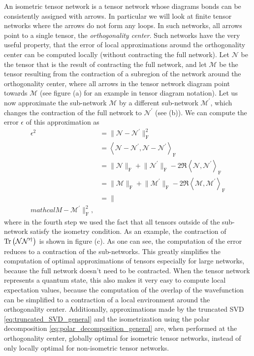 An isometric tensor network is a tensor network whose diagrams bonds can be consistently assigned with arrows. In particular we will look at finite tensor networks where the arrows do not form any loops. In such networks, all arrows point to a single tensor, the \textit{orthogonality center}. Such networks have the very useful property, that the error of local approximations around the orthogonality center can be computed locally (without contracting the full network). Let $\mathcal{N}$ be the tensor that is the result of contracting the full network, and let $\mathcal{M}$ be the tensor resulting from the contraction of a subregion of the network around the orthogonality center, where all arrows in the tensor network diagram point towards $\mathcal{M}$ (see figure (a) for an example in tensor diagram notation). Let us now approximate the sub-network $\mathcal{M}$ by a different sub-network $\mathcal{M}^\prime$, which changes the contraction of the full network to $\mathcal{N}^\prime$ (see (b)). We can compute the error $\epsilon$ of this approximation as
\begin{equation}
\begin{split}
	\epsilon^2 &= \lVert\mathcal{N}-\mathcal{N}^\prime\rVert^2_\text{F} \\
	&=
	\left\langle\mathcal{N}-\mathcal{N}^\prime, \mathcal{N}-\mathcal{N}^\prime\right\rangle_\text{F} \\
	&= \lVert\mathcal{N}\rVert_\text{F} + \lVert\mathcal{N}^\prime\rVert_\text{F} - 2\Re\left\langle\mathcal{N},\mathcal{N}^\prime\right\rangle_\text{F} \\
	&= \lVert\mathcal{M}\rVert_\text{F} + \lVert\mathcal{M}^\prime\rVert_\text{F} - 2\Re\left\langle\mathcal{M},\mathcal{M}^\prime\right\rangle_\text{F} \\
	&= \lVert\\mathcal{M}-\mathcal{M}^\prime\rVert^2_\text{F},
\end{split}
\end{equation}
where in the fourth step we used the fact that all tensors outside of the sub-network satisfy the isometry condition. As an example, the contraction of $\operatorname{Tr}\left(\mathcal{N}\mathcal{N}^{\prime\dagger}\right)$ is shown in figure (c). As one can see, the computation of the error reduces to a contraction of the sub-networks. This greatly simplifies the computation of optimal approximations of tensors especially for large networks, because the full network doesn't need to be contracted. When the tensor network represents a quantum state, this also makes it very easy to compute local expectation values, because the computation of the overlap of the wavefunction can be simplified to a contraction of a local environment around the orthogonality center. Additionally, approximations made by the truncated SVD \ref{eq:truncated_SVD_general} and the isometrization using the polar decomposition \ref{eq:polar_decomposition_general} are, when performed at the orthogonality center, globally optimal for isometric tensor networks, instead of only locally optimal for non-isometric tensor networks.
